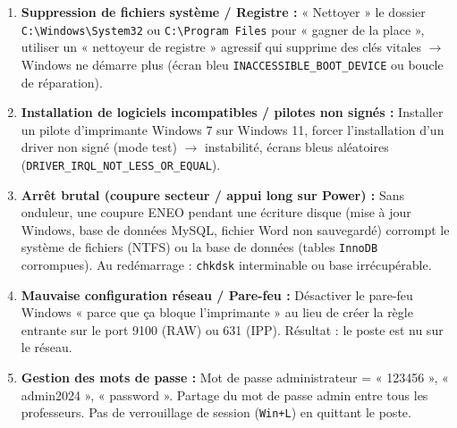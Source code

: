\documentclass[11pt]{article}
\begin{document}
\begin{enumerate}
    \item \textbf{Suppression de fichiers système / Registre :} « Nettoyer » le dossier \texttt{C:\textbackslash Windows\textbackslash System32} ou \texttt{C:\textbackslash Program Files} pour « gagner de la place », utiliser un « nettoyeur de registre » agressif qui supprime des clés vitales $\rightarrow$ Windows ne démarre plus (écran bleu \texttt{INACCESSIBLE\_BOOT\_DEVICE} ou boucle de réparation).
    \item \textbf{Installation de logiciels incompatibles / pilotes non signés :} Installer un pilote d'imprimante Windows 7 sur Windows 11, forcer l'installation d'un driver non signé (mode test) $\rightarrow$ instabilité, écrans bleus aléatoires (\texttt{DRIVER\_IRQL\_NOT\_LESS\_OR\_EQUAL}).
    \item \textbf{Arrêt brutal (coupure secteur / appui long sur Power) :} Sans onduleur, une coupure ENEO pendant une écriture disque (mise à jour Windows, base de données MySQL, fichier Word non sauvegardé) corrompt le système de fichiers (NTFS) ou la base de données (tables \texttt{InnoDB} corrompues). Au redémarrage : \texttt{chkdsk} interminable ou base irrécupérable.
    \item \textbf{Mauvaise configuration réseau / Pare-feu :} Désactiver le pare-feu Windows « parce que ça bloque l'imprimante » au lieu de créer la règle entrante sur le port 9100 (RAW) ou 631 (IPP). Résultat : le poste est nu sur le réseau.
    \item \textbf{Gestion des mots de passe :} Mot de passe administrateur = « 123456 », « admin2024 », « password ». Partage du mot de passe admin entre tous les professeurs. Pas de verrouillage de session (\texttt{Win+L}) en quittant le poste.
\end{enumerate}
\end{document}
